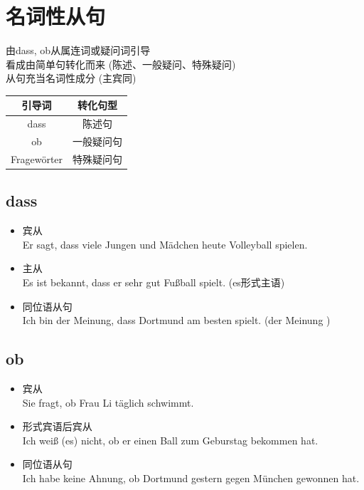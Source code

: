 \section{名词性从句}
由dass, ob从属连词或疑问词引导 \\
看成由简单句转化而来 (陈述、一般疑问、特殊疑问) \\
从句充当名词性成分 (主宾同) \\

\begin{center}
    \begin{tabular}{|c|c|}
        \hline
        \rowcolor{gray}
        引导词         & 转化句型  \\
        \hline
        dass        & 陈述句   \\
        \hline
        ob          & 一般疑问句 \\
        \hline
        Fragewörter & 特殊疑问句 \\
        \hline
    \end{tabular}
\end{center}

\subsection{dass}
\begin{itemize}
    \item 宾从 \\
          Er sagt, dass viele Jungen und Mädchen heute Volleyball spielen.
    \item 主从 \\
          Es ist bekannt, dass er sehr gut Fußball spielt. (es形式主语)
    \item 同位语从句 \\
          Ich bin der Meinung, dass Dortmund am besten spielt. (der Meinung \tri[color=yellow])
\end{itemize}

\subsection{ob}
\begin{itemize}
    \item 宾从 \\
          Sie fragt, ob Frau Li täglich schwimmt.
    \item 形式宾语后宾从 \\
          Ich weiß (es) nicht, ob er einen Ball zum Geburstag bekommen hat.
    \item 同位语从句 \\
          Ich habe keine Ahnung, ob Dortmund gestern gegen München gewonnen hat.
\end{itemize}

